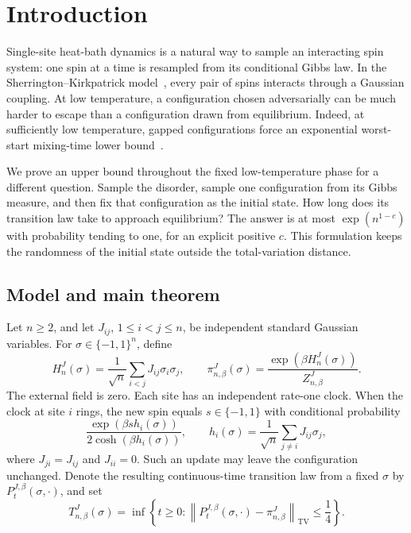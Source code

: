 \section{Introduction}\label{sec:introduction}

Single-site heat-bath dynamics is a natural way to sample an interacting
spin system: one spin at a time is resampled from its conditional Gibbs
law. In the Sherrington--Kirkpatrick model~\cite{SK1975}, every pair of
spins interacts through a Gaussian coupling. At low temperature, a
configuration chosen adversarially can be much harder to escape than a
configuration drawn from equilibrium. Indeed, at sufficiently low
temperature, gapped configurations force an exponential worst-start
mixing-time lower bound~\cite[Theorem~1.1]{Sellke2025}.

We prove an upper bound throughout the fixed low-temperature phase for a
different question. Sample the disorder, sample one configuration from
its Gibbs measure, and then fix that configuration as the initial state.
How long does its transition law take to approach equilibrium? The
answer is at most $\exp(n^{1-c})$ with probability tending to one, for
an explicit positive $c$. This formulation keeps the randomness of the
initial state outside the total-variation distance.

\subsection{Model and main theorem}

Let $n\ge2$, and let $J_{ij}$, $1\le i<j\le n$, be independent
standard Gaussian variables. For $\sigma\in\{-1,1\}^n$, define
\begin{equation*}\tag{H}\label{eq:intro-model}
 H_n^J(\sigma)=\frac1{\sqrt n}\sum_{i<j}J_{ij}\sigma_i\sigma_j,
 \qquad
 \pi_{n,\beta}^J(\sigma)
 =\frac{\exp(\beta H_n^J(\sigma))}{Z_{n,\beta}^J}.
\end{equation*}
The external field is zero. Each site has an independent rate-one clock.
When the clock at site $i$ rings, the new spin equals $s\in\{-1,1\}$
with conditional probability
\[
 \frac{\exp(\beta s h_i(\sigma))}{2\cosh(\beta h_i(\sigma))},
 \qquad
 h_i(\sigma)=\frac1{\sqrt n}\sum_{j\ne i}J_{ij}\sigma_j,
\]
where $J_{ji}=J_{ij}$ and $J_{ii}=0$. Such an update may leave the
configuration unchanged. Denote the resulting continuous-time
transition law from a fixed $\sigma$ by $P_t^{J,\beta}(\sigma,\cdot)$,
and set
\begin{equation*}\tag{T}\label{eq:intro-state-mixing-time}
 T_{n,\beta}^J(\sigma)
 =\inf\left\{t\ge0:
 \left\|P_t^{J,\beta}(\sigma,\cdot)-\pi_{n,\beta}^J\right\|_{\mathrm{TV}}
 \le\frac14\right\}.
\end{equation*}

